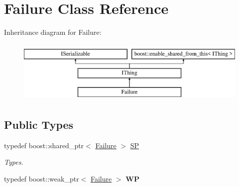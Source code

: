 \hypertarget{class_failure}{}\section{Failure Class Reference}
\label{class_failure}
Inheritance diagram for Failure\+:\begin{figure}[H]
\begin{center}
\leavevmode
\includegraphics[height=3.000000cm]{class_failure}
\end{center}
\end{figure}
\subsection*{Public Types}
\begin{DoxyCompactItemize}
\item 
\mbox{\label{class_failure_ac6f000b2607465cec6aab77983c7a615}} 
typedef boost\+::shared\+\_\+ptr$<$ \hyperlink{class_failure}{Failure} $>$ \hyperlink{class_failure_ac6f000b2607465cec6aab77983c7a615}{SP}
\begin{DoxyCompactList}\small\item\em Types. \end{DoxyCompactList}\item 
\mbox{\label{class_failure_acf76cbdbeeb671f63ff6401e5a9b2a83}} 
typedef boost\+::weak\+\_\+ptr$<$ \hyperlink{class_failure}{Failure} $>$ {\bfseries WP}
\end{DoxyCompactItemize}
